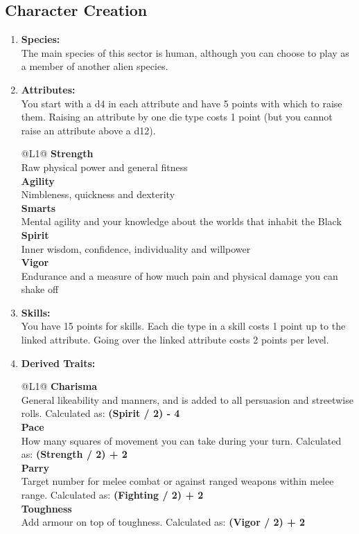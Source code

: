 \subsection{Character Creation}
\label{sec:rules-creation}

\begin{enumerate}

  \item \textbf{Species:}\\ The main species of this sector is human, although you can choose to play as a member of another alien species.
  
  \item \textbf{Attributes:}\\ You start with a d4 in each attribute and have 5 points with which to raise them. Raising an attribute by one die type costs 1 point (but you cannot raise an attribute above a d12).
    \begin{redtable}{\linewidth}{@{}L{1}@{}}
      \textbf{Strength}\\
      Raw physical power and general fitness\\
      \textbf{Agility}\\
      Nimbleness, quickness and dexterity\\
      \textbf{Smarts}\\
      Mental agility and your knowledge about the worlds that inhabit the Black\\
      \textbf{Spirit}\\
      Inner wisdom, confidence, individuality and willpower\\
      \textbf{Vigor}\\
      Endurance and a measure of how much pain and physical damage you can shake off
    \end{redtable}

  \item \textbf{Skills:}\\ You have 15 points for skills. Each die type in a skill costs 1 point up to the linked attribute. Going over the linked attribute costs 2 points per level.

  \item \textbf{Derived Traits:}
    \begin{redtable}{\linewidth}{@{}L{1}@{}}
      \textbf{Charisma}\\
      General likeability and manners, and is added to all persuasion and streetwise rolls. Calculated as: \textbf{(Spirit / 2) - 4}\\
      \textbf{Pace}\\
      How many squares of movement you can take during your turn. Calculated as: \textbf{(Strength / 2) + 2}\\
      \textbf{Parry}\\
      Target number for melee combat or against ranged weapons within melee range. Calculated as: \textbf{(Fighting / 2) + 2}\\
      \textbf{Toughness}\\
      Add armour on top of toughness. Calculated as: \textbf{(Vigor / 2) + 2}\\
    \end{redtable}


\end{enumerate}
